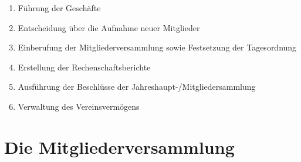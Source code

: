 \documentclass[12pt,a4paper,titlepage]{scrartcl}
\begin{document}
\begin{enumerate}
\begin{enumerate}
\item Führung der Geschäfte
\item Entscheidung über die Aufnahme neuer Mitglieder
\item Einberufung der Mitgliederversammlung sowie Festsetzung der Tagesordnung
\item Erstellung der Rechenschaftsberichte
\item Ausführung der Beschlüsse der Jahreshaupt-/Mitgliedersammlung
\item Verwaltung des Vereinsvermögens
\end{enumerate}
\end{enumerate}


\section{Die Mitgliederversammlung}
\end{document}
